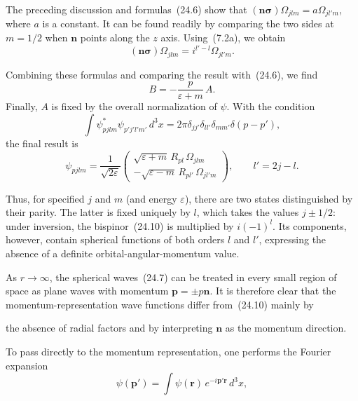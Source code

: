 The preceding discussion and formulas~(24.6) show that $(\mathbf{n}\boldsymbol{\sigma})\Omega_{jlm} = a\Omega_{jl'm}$, where $a$ is a constant. It can be found readily by comparing the two sides at $m = 1/2$ when $\mathbf{n}$ points along the $z$ axis. Using~(7.2a), we obtain
\begin{equation}
(\mathbf{n}\boldsymbol{\sigma})\Omega_{jlm} = i^{l'-l}\Omega_{jl'm}.
\tag{24.8}
\end{equation}

Combining these formulas and comparing the result with~(24.6), we find
\[
B = -\frac{p}{\varepsilon + m}\,A.
\]
Finally, $A$ is fixed by the overall normalization of $\psi$. With the condition
\begin{equation}
\int \psi^*_{pjlm}\psi_{p'j'l'm'}\,d^3x = 2\pi\delta_{jj'}\delta_{ll'}\delta_{mm'}\delta(p - p'),
\tag{24.9}
\end{equation}
the final result is
\begin{equation}
\psi_{pjlm} = \frac{1}{\sqrt{2\varepsilon}}\begin{pmatrix} \sqrt{\varepsilon + m}\,R_{pl}\,\Omega_{jlm}\\ -\sqrt{\varepsilon - m}\,R_{pl'}\,\Omega_{jl'm} \end{pmatrix},\qquad l' = 2j - l.
\tag{24.10}
\end{equation}

Thus, for specified $j$ and $m$ (and energy $\varepsilon$), there are two states distinguished by their parity. The latter is fixed uniquely by $l$, which takes the values $j \pm 1/2$: under inversion, the bispinor~(24.10) is multiplied by $i(-1)^l$. Its components, however, contain spherical functions of both orders $l$ and $l'$, expressing the absence of a definite orbital-angular-momentum value.

As $r \to \infty$, the spherical waves~(24.7) can be treated in every small region of space as plane waves with momentum $\mathbf{p} = \pm p\mathbf{n}$. It is therefore clear that the momentum-representation wave functions differ from~(24.10) mainly by

the absence of radial factors and by interpreting $\mathbf{n}$ as the momentum direction.

To pass directly to the momentum representation, one performs the Fourier expansion
\begin{equation}
\psi(\mathbf{p}') = \int \psi(\mathbf{r})\,e^{-i\mathbf{p}'\mathbf{r}}\,d^3x,
\tag{24.11}
\end{equation}

